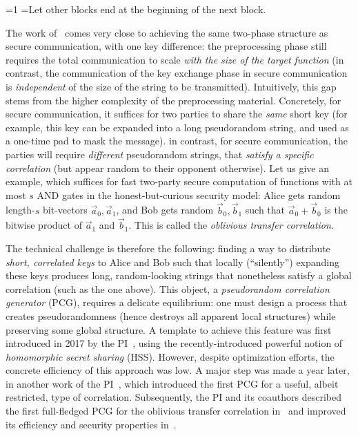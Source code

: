 \documentclass[oneside, a4paper, onecolumn, 11pt]{article}
\newcounter{alphasect}
\def\alphainsection{0}
\newenvironment{alphasection}{%
  \ifnum\alphainsection=1%
    \errhelp={Let other blocks end at the beginning of the next block.}
    \errmessage{Nested Alpha section not allowed}
  \fi%
  \setcounter{alphasect}{0}
  \def\alphainsection{1}
}{%
  \setcounter{alphasect}{0}
  \def\alphainsection{0}
}%
\begin{document}
\begin{alphasection}
The work of~\cite{C:IKNP03} comes very close to achieving the same two-phase structure as secure communication, with one key difference: the preprocessing phase still requires the total communication to scale \emph{with the size of the target function} (in contrast, the communication of the key exchange phase in secure communication is \emph{independent} of the size of the string to be transmitted). Intuitively, this gap stems from the higher complexity of the preprocessing material. Concretely, for secure communication, it suffices for two parties to share the \emph{same} short key (for example, this key can be expanded into a long pseudorandom string, and used as a one-time pad to mask the message). in contrast, for secure communication, the parties will require \emph{different} pseudorandom strings, that \emph{satisfy a specific correlation} (but appear random to their opponent otherwise). Let us give an example, which suffices for fast two-party secure computation of functions with at most $s$ AND gates in the honest-but-curious security model: Alice gets random length-$s$ bit-vectors $\vec{a}_0, \vec{a}_1$, and Bob gets random $\vec{b}_0, \vec{b}_1$ such that $\vec{a}_0+\vec{b}_0$ is the bitwise product of $\vec{a}_1$ and $\vec{b}_1$. This is called the \emph{oblivious transfer correlation}.

The technical challenge is therefore the following: finding a way to distribute \emph{short, correlated keys} to Alice and Bob such that locally (``silently'') expanding these keys produces long, random-looking strings that nonetheless satisfy a global correlation (such as the one above). This object, a \emph{pseudorandom correlation generator} (PCG), requires a delicate equilibrium: one must design a process that creates pseudorandomness (hence destroys all apparent local structures) while preserving some global structure. A template to achieve this feature was first introduced in 2017 by the PI~\cite{CCS:BCGIO17}, using the recently-introduced powerful notion of \emph{homomorphic secret sharing} (HSS). However, despite optimization efforts, the concrete efficiency of this approach was low. A major step was made a year later, in another work of the PI~\cite{CCS:BCGI18}, which introduced the first PCG for a useful, albeit restricted, type of correlation. Subsequently, the PI and its coauthors described the first full-fledged PCG for the oblivious transfer correlation in~\cite{C:BCGIKS19} and improved its efficiency and security properties in~\cite{CCS:BCGIKRS19}.


\end{alphasection}
\end{document}

